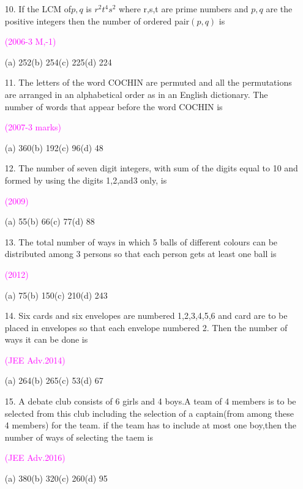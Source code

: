 \documentclass[journal,12pt,twocolumn]{IEEEtran}
\theoremstyle{remark}
\begin{document}
\begin{enumerate}
(a) $(m+n-1)^2$\quad(b) $4^{m+n-1}$\\
(c) $m^2n^2$\quad(d) $m(m+1)n(n+1)$
\item[10.] If the LCM of$p,q$ is $r^2t^4s^2$ where r,s,t are prime numbers and $p,q$ are the positive integers then the number of ordered pair$(p,q)$ is\\
\begin{flushright}
    \textcolor{magenta}{(2006-3 M,-1)}
\end{flushright}
(a) 252\quad(b) 254\quad(c) 225\quad(d) 224
\item[11.]The letters of the word COCHIN are permuted and all the permutations are arranged in an alphabetical order as in an English dictionary. The number of words that appear before the word COCHIN is\\
\begin{flushright}
    \textcolor{magenta}{(2007-3 marks)}
\end{flushright}
(a) 360\quad(b) 192\quad(c) 96\quad(d) 48
\item[12.]The number of seven digit integers, with sum of the digits equal to 10 and formed by using the digits 1,2,and3 only, is\\
\begin{flushright}
    \textcolor{magenta}{(2009)}
\end{flushright}
(a) 55\quad(b) 66\quad(c) 77\quad(d) 88
\item[13.]The total number of ways in which 5 balls of different colours can be distributed among 3 persons so that each person gets at least one ball is\\
\begin{flushright}
    \textcolor{magenta}{(2012)}
\end{flushright}
(a) 75\quad(b) 150\quad(c) 210\quad(d) 243
\item[14.]Six cards and six envelopes are numbered 1,2,3,4,5,6 and card are to be placed in envelopes so that each envelope numbered 2. Then the number of ways it can be done is\\
\begin{flushright}
    \textcolor{magenta}{(JEE Adv.2014)}
\end{flushright}
(a) 264\quad(b) 265\quad(c) 53\quad(d) 67
\item[15.]A debate club consists of 6 girls and 4 boys.A team of 4 members is to be selected from this club including the selection of a captain(from among these 4 members) for the team. if the team has to include at most one boy,then the number of ways of selecting the taem is\\
\begin{flushright}
    \textcolor{magenta}{(JEE Adv.2016)}
\end{flushright}
(a) 380\quad(b) 320\quad(c) 260\quad(d) 95

\end{enumerate}
\end{document}
